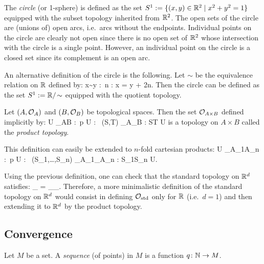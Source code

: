 \be
The \emph{circle} (or 1-sphere) is defined as the set $S^1:= \{(x,y)\in \mathbb{R}^2\mid x^2+y^2=1\}$ equipped with the subset topology inherited from $\mathbb{R}^2$. The open sets of the circle are (unions of) open arcs, i.e.\ arcs without the endpoints. Individual points on the circle are clearly not open since there is no open set of $\mathbb{R}^2$ whose intersection with the circle is a single point. However, an individual point on the circle is a closed set since its complement is an open arc.

An alternative definition of the circle is the following. Let $\sim$ be the equivalence relation on $\mathbb{R}$ defined by:
\bse
x\sim y :\eqv \exists \, n \in \Z : x = y + 2\pi n. 
\ese
Then the circle can be defined as the set $S^1:=\mathbb{R}/\!\sim$ equipped with the quotient topology.
\ee



\bd
Let $(A,\mathcal{O}_A)$ and $(B,\mathcal{O}_B)$ be topological spaces. Then the set $\mathcal{O}_{A\times B}$ defined implicitly by:
\bse
U \in \cO_{A\times B} :\eqv \forall \, p \in U : \exists \, (S,T) \in \cO_A\times \cO_B : S\times T \se U
\ese
is a topology on $A\times B$ called the \emph{product topology}.
\ed

\br
This definition can easily be extended to $n$-fold cartesian products:
\bse
U \in \cO_{A_1\times \cdots \times A_n} :\eqv \forall \, p \in U : \exists \, (S_1,\ldots,S_n) \in \cO_{A_1}\times \cdots \times \cO_{A_n} : S_1\times \cdots\times S_n \se U.
\ese
\er

\br
Using the previous definition, one can check that the standard topology on $\mathbb{R}^d$ satisfies:
\bse
\cO_ = \cO_{\underbrace{\scriptstyle \R\times\R\times\cdots\times\R}_}.
\ese
Therefore, a more minimalistic definition of the standard topology on $\mathbb{R}^d$ would consist in defining $\mathcal{O}_\mathrm{std}$ only for $\mathbb{R}$ (i.e.\ $d=1$) and then extending it to $\mathbb{R}^d$ by the product topology.
\er


\subsection{Convergence}

\bd
Let $M$ be a set. A \emph{sequence} (of points) in $M$ is a function $q \colon \mathbb{N} \to  M$.
\ed

